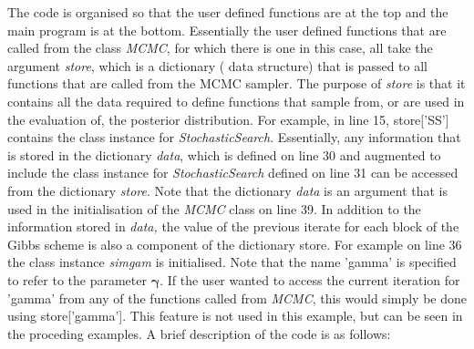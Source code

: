 \documentclass[article]{jss}
\begin{document}
The code is organised so that the user defined
functions are at the top and the main program is at the bottom.
Essentially the user defined functions that are called from the class \emph{MCMC},
for which there is one in this case, all take the argument
\emph{store}, which is a dictionary ( data structure)
that is passed to all functions that are called from the MCMC sampler.
The purpose of \emph{store} is that it contains all the data required
to define functions that sample from, or are used in the evaluation of,
the posterior distribution. For example, in line 15, store{[}'SS'{]}
contains the class instance for \emph{StochasticSearch}.  Essentially,
any information that is stored in the dictionary \emph{data}, which is
defined on line 30 and augmented to include the class instance for
\emph{StochasticSearch} defined on line 31 can be accessed from the
dictionary \emph{store}. Note that the dictionary \emph{data} is an
argument that is used in the initialisation of the \emph{MCMC} class
on line 39. In addition to the information stored in \emph{data,} the
value of the previous iterate for each block of the Gibbs scheme is
also a component of the dictionary store. For example on line 36 the
class instance \emph{simgam} is initialised. Note that the name
'gamma' is specified to refer to the parameter $\bm{\gamma}.$ If the
user wanted to access the current iteration for 'gamma' from any of
the functions called from \emph{MCMC}, this would simply be done using
store{[}'gamma'{]}. This feature is not used in this example, but can
be seen in the proceding examples. A brief description of the code is
as follows:
\end{document}
